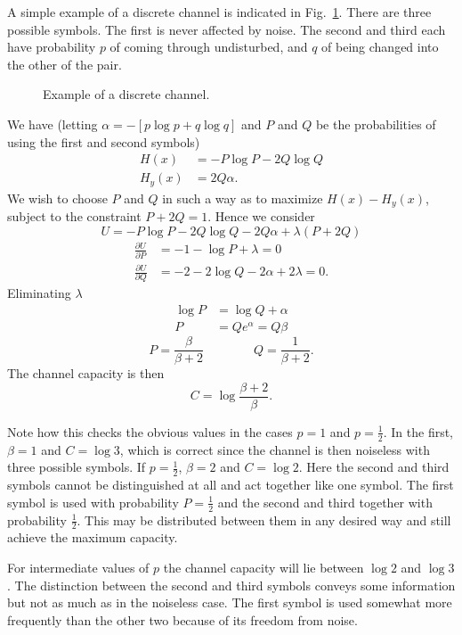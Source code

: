 A simple example of a discrete channel is indicated in Fig.~\ref{fig:11}.
There are three possible symbols.  The first is never affected by noise.
The second and third each have probability $p$ of coming through
undisturbed, and $q$ of being changed into the other of the pair.
\begin{figure}[ht]
\centerline{}
\caption{Example of a discrete channel.}
\label{fig:11}
\end{figure}
We have (letting $\alpha = - [ p \log p + q \log q ]$ and $P$
and $Q$ be the probabilities of using the first and second symbols)
\begin{align*}
H(x) &= - P \log P - 2Q \log Q \\
H_y(x) &= 2Q \alpha.
\end{align*}
We wish to choose $P$ and $Q$ in such a way as to maximize $H(x) - H_y(x)$,
subject to the constraint $P + 2Q =1$.  Hence we consider
$$
U = - P \log P - 2Q \log Q - 2Q \alpha + \lambda (P + 2Q)
$$ 
\begin{align*}
\frac{\partial U}{\partial P} &= - 1 - \log P + \lambda = 0 \\
\frac{\partial U}{\partial Q} &= - 2 -2 \log Q - 2 \alpha + 2 \lambda = 0.
\end{align*}
Eliminating $\lambda$
\begin{align*}
\log P &= \log Q + \alpha \\
P &= Qe^{\alpha} = Q \beta 
\end{align*}
$$
P = \frac{\beta}{\beta +2} \qquad\qquad Q = \frac{1}{\beta + 2 }.
$$
The channel capacity is then
$$
C = \log \frac{\beta + 2 }{\beta}.
$$

Note how this checks the obvious values in the cases $p=1$ and $p =
\frac12$.  In the first, $\beta = 1$ and $C= \log 3$, which is correct
since the channel is then noiseless with three possible symbols.  If $p
= \frac12$, $\beta = 2$ and $C = \log 2$.  Here the second and third
symbols cannot be distinguished at all and act together like one symbol.
The first symbol is used with probability $P = \frac12$ and the second
and third together with probability $\frac12$.  This may be distributed
between them in any desired way and still achieve the maximum capacity.

For intermediate values of $p$ the channel capacity will lie between $\log
2$ and $\log 3$.  The distinction between the second and third symbols
conveys some information but not as much as in the noiseless case.
The first symbol is used somewhat more frequently than the other two
because of its freedom from noise.

